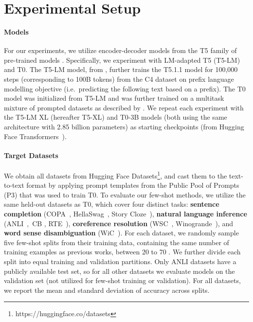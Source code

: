 \section{Experimental Setup}

\paragraph{Models}
For our experiments, we utilize encoder-decoder models from the T5 family of pre-trained models \cite{raffel2020t5}. Specifically, we experiment with LM-adapted T5 (T5-LM) and T0. The T5-LM model, from \citet{lester-etal-2021-power}, further trains the T5.1.1 model for 100,000 steps (corresponding to 100B tokens) from the C4 dataset on prefix language modelling objective (i.e.\ predicting the following text based on a prefix). The T0 model was initialized from T5-LM and was further trained on a multitask mixture of prompted datasets as described by \citet{sanh2022multitask}.
We repeat each experiment with the T5-LM XL (hereafter T5-XL) and T0-3B models (both using the same architecture with 2.85 billion parameters) as starting checkpoints (from Hugging Face Transformers~\citep{wolf-etal-2020-transformers}).

\paragraph{Target Datasets}
We obtain all datasets from Hugging Face Datasets\footnote{https://huggingface.co/datasets}, and cast them to the text-to-text format by applying prompt templates from the Public Pool of Prompts (P3) \citep{bach-etal-2022-promptsource} that was used to train T0.
To evaluate our few-shot methods, we utilize the same held-out datasets as T0, which cover four distinct tasks: \textbf{sentence completion} (COPA~\citep{gordon-etal-2012-semeval}, HellaSwag~\citep{zellers-etal-2019-hellaswag}, Story Cloze~\citep{sharma-etal-2018-tackling}), \textbf{natural language inference} (ANLI~\citep{nie-etal-2020-adversarial},~CB \citep{Marneffe2019TheCI}, RTE~\citep{10.1007/11736790_9}), \textbf{coreference resolution} (WSC~\citep{levesque2012winograd}, Winogrande~\citep{winogrande}), and \textbf{word sense disambiguation} (WiC~\citep{pilehvar-camacho-collados-2019-wic}). For each dataset, we randomly sample five few-shot splits from their training data, containing the same number of training examples as previous works, between 20 to 70 \citep{NEURIPS2020_1457c0d6,liu2020tfew}. We further divide each split into equal training and validation partitions. Only ANLI datasets have a publicly available test set, so for all other datasets we evaluate models on the validation set (not utilized for few-shot training or validation). For all datasets, we report the mean and standard deviation of accuracy across splits.

